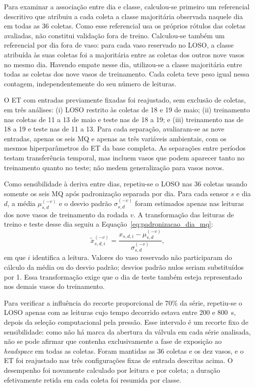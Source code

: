 Para examinar a associação entre dia e classe, calculou-se primeiro um
referencial descritivo que atribuiu a cada coleta a classe majoritária
observada naquele dia em todas as 36 coletas. Como esse referencial usa
os próprios rótulos das coletas avaliadas, não constitui validação
fora de treino. Calculou-se também um referencial por dia fora de vaso:
para cada vaso reservado no LOSO, a classe atribuída às suas coletas foi
a majoritária entre as coletas dos outros nove vasos no mesmo dia.
Havendo empate nesse dia, utilizou-se a classe majoritária entre todas
as coletas dos nove vasos de treinamento. Cada coleta teve peso igual
nessa contagem, independentemente do seu número de leituras.

O ET com entradas previamente fixadas foi reajustado, sem exclusão de
coletas, em três análises: (i) LOSO restrito às coletas de 18 e 19 de maio;
(ii) treinamento nas coletas de 11 a 13 de maio e teste nas de 18 a 19;
e (iii) treinamento nas de 18 a 19 e teste nas de 11 a 13. Para cada
separação, avaliaram-se as nove entradas, apenas os seis MQ e apenas as
três variáveis ambientais, com os mesmos hiperparâmetros do ET da base
completa. As separações entre períodos testam transferência temporal,
mas incluem vasos que podem aparecer tanto no treinamento quanto no
teste; não medem generalização para vasos novos.

Como sensibilidade à deriva entre dias, repetiu-se o LOSO nas 36 coletas
usando somente os seis MQ após padronização separada por dia. Para cada
sensor $s$ e dia $d$, a média $\mu_{s,d}^{(-v)}$ e o desvio padrão
$\sigma_{s,d}^{(-v)}$ foram estimados apenas nas leituras dos nove vasos
de treinamento da rodada $v$. A transformação das leituras de treino e
teste desse dia seguiu a Equação~\eqref{eq:padronizacao_dia_mq}:
\begin{equation}
    \widetilde{x}_{s,d,i}^{(-v)}=
    \frac{x_{s,d,i}-\mu_{s,d}^{(-v)}}
         {\sigma_{s,d}^{(-v)}},
    \label{eq:padronizacao_dia_mq}
\end{equation}
em que $i$ identifica a leitura. Valores do vaso reservado não
participaram do cálculo da média ou do desvio padrão; desvios padrão
nulos seriam substituídos por 1. Essa transformação exige que o dia de
teste também esteja representado nos demais vasos do treinamento.

Para verificar a influência do recorte proporcional de 70\% da série,
repetiu-se o LOSO apenas com as leituras cujo tempo decorrido estava
entre 200 e 800~s, depois da seleção computacional pela pressão. Esse intervalo é um
recorte fixo de sensibilidade: como não há marca da abertura da válvula
em cada série analisada, não se pode afirmar que contenha exclusivamente
a fase de exposição ao \textit{headspace} em todas as coletas. Foram mantidas as 36
coletas e os dez vasos, e o ET foi reajustado nas três configurações
fixas de entrada descritas acima. O desempenho foi novamente calculado
por leitura e por coleta; a duração efetivamente retida em cada coleta
foi resumida por classe.

